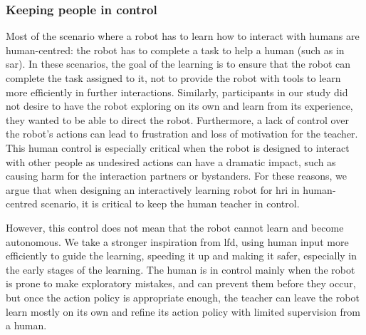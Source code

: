 \subsubsection{Keeping people in control}

Most of the scenario where a robot has to learn how to interact with humans are human-centred: the robot has to complete a task to help a human (such as in \gls{sar}). In these scenarios, the goal of the learning is to ensure that the robot can complete the task assigned to it, not to provide the robot with tools to learn more efficiently in further interactions. Similarly, participants in our study did not desire to have the robot exploring on its own and learn from its experience, they wanted to be able to direct the robot. Furthermore, a lack of control over the robot's actions can lead to frustration and loss of motivation for the teacher. This human control is especially critical when the robot is designed to interact with other people as undesired actions can have a dramatic impact, such as causing harm for the interaction partners or bystanders. For these reasons, we argue that when designing an interactively learning robot for \gls{hri} in human-centred scenario, it is critical to keep the human teacher in control. 

However, this control does not mean that the robot cannot learn and become autonomous. We take a stronger inspiration from \gls{lfd}, using human input more efficiently to guide the learning, speeding it up and making it safer, especially in the early stages of the learning. The human is in control mainly when the robot is prone to make exploratory mistakes, and can prevent them before they occur, but once the action policy is appropriate enough, the teacher can leave the robot learn mostly on its own and refine its action policy with limited supervision from a human.


